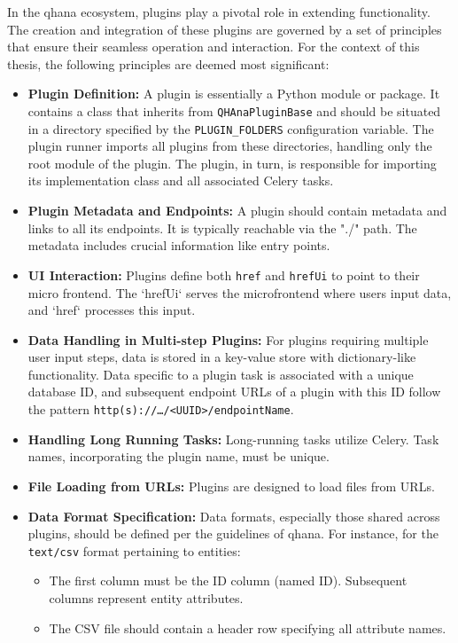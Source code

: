 \documentclass[
  a4paper,  %
  twoside,  %
  bibliography=totoc,
  headsepline,
  cleardoublepage=empty,
  parskip=half,
  draft=false
]{scrbook}
\begin{document}
In the \gls{qhana} ecosystem, plugins play a pivotal role in extending functionality.
The creation and integration of these plugins are governed by a set of principles that ensure their seamless operation and interaction.
For the context of this thesis, the following principles are deemed most significant:

\begin{itemize}
    \item \textbf{Plugin Definition:}
    A plugin is essentially a Python module or package.
    It contains a class that inherits from \texttt{QHAnaPluginBase} and should be situated in a directory specified by the \texttt{PLUGIN\_FOLDERS} configuration variable.
    The plugin runner imports all plugins from these directories, handling only the root module of the plugin.
    The plugin, in turn, is responsible for importing its implementation class and all associated Celery tasks.

    \item \textbf{Plugin Metadata and Endpoints:}
    A plugin should contain metadata and links to all its endpoints. It is typically reachable via the "./" path.
    The metadata includes crucial information like entry points.

    \item \textbf{UI Interaction:}
    Plugins define both \texttt{href} and \texttt{hrefUi} to point to their micro frontend.
    The `hrefUi` serves the microfrontend where users input data, and `href` processes this input.

    \item \textbf{Data Handling in Multi-step Plugins:}
    For plugins requiring multiple user input steps, data is stored in a key-value store with dictionary-like functionality.
    Data specific to a plugin task is associated with a unique database ID, and subsequent endpoint URLs of a plugin with this ID follow the pattern \texttt{http(s)://…/<UUID>/endpointName}.

    \item \textbf{Handling Long Running Tasks:}
    Long-running tasks utilize Celery. Task names, incorporating the plugin name, must be unique.

    \item \textbf{File Loading from URLs:}
    Plugins are designed to load files from URLs.

    \item \textbf{Data Format Specification:}
    Data formats, especially those shared across plugins, should be defined per the guidelines of \gls{qhana}.
    For instance, for the \texttt{text/csv} format pertaining to entities:
    \begin{itemize}
        \item The first column must be the ID column (named ID). Subsequent columns represent entity attributes.
        \item The CSV file should contain a header row specifying all attribute names.
    \end{itemize}
\end{itemize}
\end{document}
